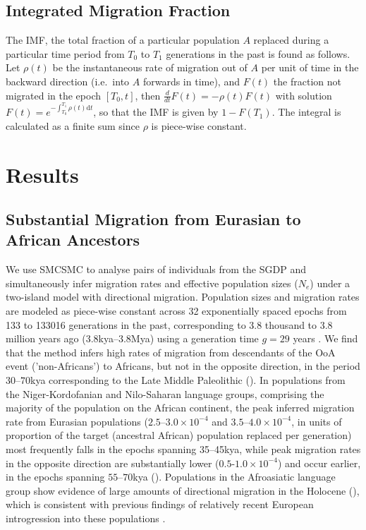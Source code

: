 \subsection{Integrated Migration Fraction}
The IMF, the total fraction of a particular population $A$ replaced during a particular time period from $T_0$ to $T_1$ generations in the past is found as follows. Let $\rho(t)$ be the instantaneous rate of migration out of $A$ per unit of time in the backward direction (i.e.\ into $A$ forwards in time), and $F(t)$ the fraction not migrated in the epoch $[T_0,t]$, then $\frac{d}{dt} F(t) = -\rho(t) F(t)$ with solution $F(t) = e^{- \int_{T_0}^{T_1} \rho(t) {\mathrm{d}t}}$, so that the IMF is given by $1-F(T_1)$.  The integral is calculated as a finite sum since $\rho$ is piece-wise constant.




\section{Results}

\subsection{Substantial Migration from Eurasian to African Ancestors} We use SMCSMC to analyse pairs of individuals from the SGDP and simultaneously infer migration rates and effective population sizes ($N_e$) under a two-island model with directional migration.  Population sizes and migration rates are modeled as piece-wise constant across 32 exponentially spaced epochs from 133 to 133016 generations in the past, corresponding to 3.8 thousand to 3.8 million years ago (3.8kya--3.8Mya) using a generation time $g=29$ years \cite{Fenner2005}.  We find that the method infers high rates of migration from descendants of the OoA event ('non-Africans') to Africans, but not in the opposite direction, in the period $30$--$70$kya corresponding to the Late Middle Paleolithic (). In populations from the Niger-Kordofanian and Nilo-Saharan language groups, comprising the majority of the population on the African continent, the peak inferred migration rate from Eurasian populations ($2.5$--$3.0\times 10^{-4}$ and $3.5$--$4.0\times 10^{-4}$, in units of proportion of the target (ancestral African) population replaced per generation) most frequently falls in the epochs spanning 35--45kya, while peak migration rates in the opposite direction are substantially lower ($0.5$-$1.0\times 10^{-4}$) and occur earlier, in the epochs spanning $55$--$70$kya (). Populations in the Afroasiatic language group show evidence of large amounts of directional migration in the Holocene (), which is consistent with previous findings of relatively recent European introgression into these populations \cite{Busby2016, Fan2019}. 

